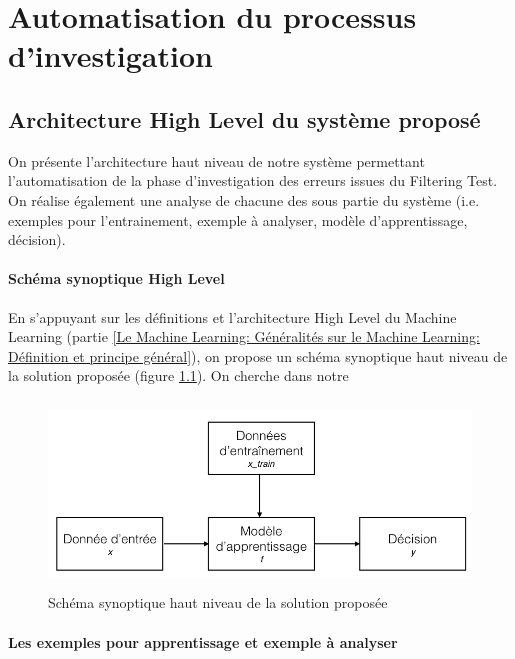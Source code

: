 \chapter{Automatisation du processus d'investigation}
\label{Automatisation du processus d'investigation}
\thispagestyle{fancy}


\section{Architecture High Level du système proposé}
\label{Automatisation du processus d'investigation: Achitecture High Level du système proposé}
On présente l'architecture haut niveau de notre système permettant l'automatisation de la phase d'investigation des erreurs issues du Filtering Test. On réalise également une analyse de chacune des sous partie du système (i.e. exemples pour l'entrainement, exemple à analyser, modèle d'apprentissage, décision).

\subsubsection{Schéma synoptique High Level}
\label{Automatisation du processus d'investigation: Achitecture High Level du système proposé: Schéma synoptique High Level}
En s'appuyant sur les définitions et l'architecture High Level du Machine Learning (partie \ref{Le Machine Learning: Généralités sur le Machine Learning: Définition et principe général}), on propose un schéma synoptique haut niveau de la solution proposée (figure \ref{fig:Schéma synoptique haut niveau de la solution proposée}). On cherche dans notre 

\begin{figure}[h]
	\centering\includegraphics[height=5cm]{images/ML_high_level.jpeg}
	\caption{Schéma synoptique haut niveau de la solution proposée}
	\label{fig:Schéma synoptique haut niveau de la solution proposée}
\end{figure}

\subsubsection{Les exemples pour apprentissage et exemple à analyser}
\label{Automatisation du processus d'investigation: Achitecture High Level du système proposé: Les exemples d'apprentissage}

